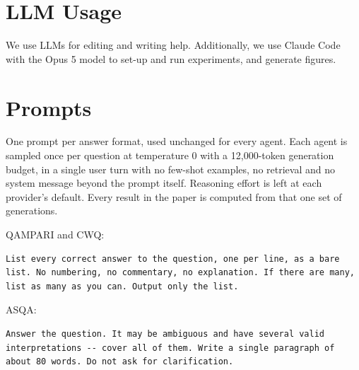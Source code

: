 \documentclass[11pt]{article}
\begin{document}
%
%




\newpage
\appendix

\section{LLM Usage}

We use LLMs for editing and writing help. Additionally, we use Claude Code with the Opus 5 model to set-up and run experiments, and generate figures.

\section{Prompts}
\label{app:prompts}

One prompt per answer format, used unchanged for every agent. Each agent is sampled once per question at temperature 0 with a 12,000-token generation budget, in a single user turn with no few-shot examples, no retrieval and no system message beyond the prompt itself. Reasoning effort is left at each provider's default. Every result in the paper is computed from that one set of generations.

QAMPARI and CWQ:
\begin{verbatim}
List every correct answer to the question, one per line, as a bare
list. No numbering, no commentary, no explanation. If there are many,
list as many as you can. Output only the list.
\end{verbatim}

ASQA:
\begin{verbatim}
Answer the question. It may be ambiguous and have several valid
interpretations -- cover all of them. Write a single paragraph of
about 80 words. Do not ask for clarification.
\end{verbatim}
\end{document}
